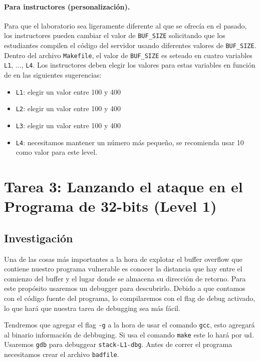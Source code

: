 \paragraph{Para instructores (personalización).}
Para que el laboratorio sea ligeramente diferente al que se ofrecía en el pasado,
los instructores pueden cambiar el valor de \texttt{BUF\_SIZE} solicitando
que los estudiantes compilen el código del servidor usando diferentes valores de \texttt {BUF\_SIZE}.
Dentro del archivo \texttt{Makefile}, el valor de \texttt{BUF\_SIZE} es seteado en 
cuatro variables \texttt{L1}, ..., \texttt{L4}.
Los instructores deben elegir los valores para estas variables en función de
en las siguientes sugerencias:

\begin{itemize}[noitemsep]
\item \texttt{L1}: elegir un valor entre 100 y 400
\item \texttt{L2}: elegir un valor entre 100 y 400
\item \texttt{L3}: elegir un valor entre 100 y 400
\item \texttt{L4}: necesitamos mantener un número más pequeño, se recomienda usar 10 como valor para este level.
\end{itemize}
 


\section{Tarea 3: Lanzando el ataque en el Programa de 32-bits (Level 1)}

\subsection{Investigación} 

Una de las cosas más importantes a la hora de explotar el buffer overflow que contiene nuestro programa vulnerable es conocer la distancia que hay entre el comienzo del buffer y el lugar donde se almacena su dirección de retorno.
Para este propósito usaremos un debugger para descubrirlo.
Debido a que contamos con el código fuente del programa, lo compilaremos con el flag de debug activado, lo que hará que nuestra tarea de debugging sea más fácil.

Tendremos que agregar el flag \texttt{-g} a la hora de usar el comando \texttt{gcc}, esto agregará al binario información de debbuging. Si usa el comando \texttt{make} este lo hará por ud. 
Usaremos \texttt{gdb} para debuggear \texttt{stack-L1-dbg}.
Antes de correr el programa necesitamos crear el archivo \texttt{badfile}.


